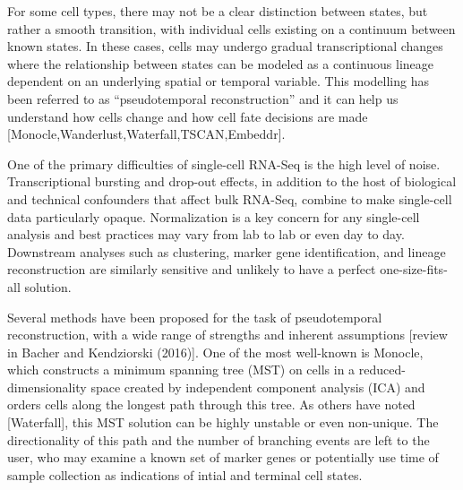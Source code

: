 \documentclass[11pt]{article}\usepackage[]{graphicx}\usepackage[]{color}
\begin{document}
For some cell types, there may not be a clear distinction between states, but rather a smooth transition, with individual cells existing on a continuum between known states. In these cases, cells may undergo gradual transcriptional changes where the relationship between states can be modeled as a continuous lineage dependent on an underlying spatial or temporal variable. This modelling has been referred to as ``pseudotemporal reconstruction'' and it can help us understand how cells change and how cell fate decisions are made [Monocle,Wanderlust,Waterfall,TSCAN,Embeddr].

One of the primary difficulties of single-cell RNA-Seq is the high level of noise. Transcriptional bursting and drop-out effects, in addition to the host of biological and technical confounders that affect bulk RNA-Seq, combine to make single-cell data particularly opaque. Normalization is a key concern for any single-cell analysis and best practices may vary from lab to lab or even day to day. Downstream analyses such as clustering, marker gene identification, and lineage reconstruction are similarly sensitive and unlikely to have a perfect one-size-fits-all solution. 

Several methods have been proposed for the task of pseudotemporal reconstruction, with a wide range of strengths and inherent assumptions [review in Bacher and Kendziorski (2016)]. One of the most well-known is Monocle, which constructs a minimum spanning tree (MST) on cells in a reduced-dimensionality space created by independent component analysis (ICA) and orders cells along the longest path through this tree. As others have noted [Waterfall], this MST solution can be highly unstable or even non-unique. The directionality of this path and the number of branching events are left to the user, who may examine a known set of marker genes or potentially use time of sample collection as indications of intial and terminal cell states.

\end{document}
